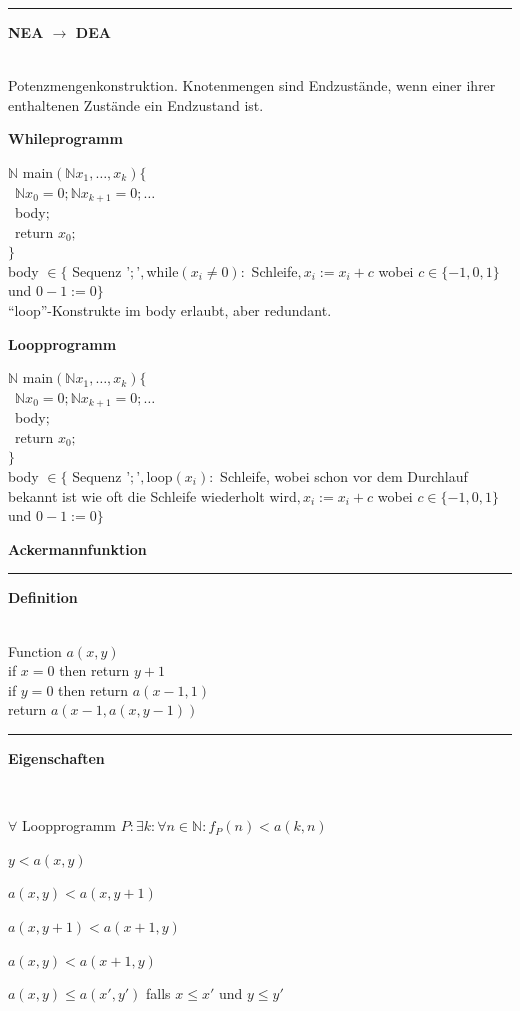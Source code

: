 \documentclass{article}
\newcommand{\h}[1]{\vspace{1ex}\begin{center}\small\textbf{#1}\end{center}}
\newcommand{\hh}[1]{{\vspace{1pt}\hrule\vspace{1pt} \noindent\textbf{#1}}\\}
\newenvironment{tightlist}{
\begin{list}{\textbullet}{
\setlength{\topsep}{-1ex}
\setlength{\itemsep}{-1ex}
\setlength{\leftmargin}{4ex}
}
}{
\end{list}
\vspace{1ex}
}
\begin{document}
\begin{multicols}{4}
\hh{NEA $\to$ DEA}
Potenzmengenkonstruktion. Knotenmengen sind Endzustände, wenn einer ihrer enthaltenen Zustände ein Endzustand ist.


\h{Whileprogramm}
$\mathbb{N}$ main$(\mathbb{N} x_1, \ldots, x_k ) \{$\\
\ $\mathbb{N} x_0 = 0;\mathbb{N} x_{k+1}=0;\ldots$\\
\ body$;$\\
\ return $x_0;$\\
$\}$\\
body $\in\{ $ Sequenz '$;$'$,$while$(x_i\ne 0):$ Schleife$, x_i:=x_i+c$ wobei $c\in\{-1, 0, 1\}$ und $0-1:=0\}$\\
"`loop"'-Konstrukte im body erlaubt, aber redundant.
\h{Loopprogramm}
$\mathbb{N}$ main$(\mathbb{N} x_1, \ldots, x_k ) \{$\\
\ $\mathbb{N} x_0 = 0;\mathbb{N} x_{k+1}=0;\ldots$\\
\ body$;$\\
\ return $x_0;$\\
$\}$\\
body $\in\{ $ Sequenz '$;$'$,$loop$(x_i):$ Schleife, wobei schon vor dem Durchlauf bekannt ist wie oft die Schleife wiederholt wird$, x_i:=x_i+c$ wobei $c\in\{-1, 0, 1\}$ und $0-1:=0\}$\\


\h{Ackermannfunktion}
\hh{Definition}
Function $a(x, y)$\\
if $x=0$ then return $y+1$\\
if $y=0$ then return $a(x-1, 1)$\\
return $a(x-1, a(x, y-1))$\\
\hh{Eigenschaften}
\begin{tightlist}
\item $\forall$ Loopprogramm $P:\exists k:\forall n\in\mathbb{N}:f_P(n)<a(k, n)$
\item $y<a(x, y)$
\item $a(x, y)<a(x, y+1)$
\item $a(x, y+1)<a(x+1, y)$
\item $a(x, y)<a(x+1, y)$
\item $a(x, y)\le a(x', y')$ falls $x\le x'$ und $y\le y'$
\end{tightlist}


\end{multicols}
\end{document}
